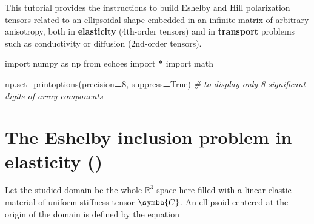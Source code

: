\documentclass[
  a4paper,
  numbers=noendperiod,
  DIV=12]{scrreprt}
\newenvironment{Shaded}{\begin{snugshade}}{\end{snugshade}}
\newcommand{\CommentTok}[1]{\textcolor[rgb]{0.56,0.35,0.01}{\textit{#1}}}
\newcommand{\DecValTok}[1]{\textcolor[rgb]{0.00,0.00,0.81}{#1}}
\newcommand{\ImportTok}[1]{#1}
\newcommand{\NormalTok}[1]{#1}
\newcommand{\OperatorTok}[1]{\textcolor[rgb]{0.81,0.36,0.00}{\textbf{#1}}}
\newcommand{\VariableTok}[1]{\textcolor[rgb]{0.00,0.00,0.00}{#1}}
\newcommand{\R}{{\mathbb{{R}}}}
\newcommand{\uuuu}[1]{{\symbb{{#1}}}}
\begin{document}
\begin{tcolorbox}[enhanced jigsaw, arc=.35mm, bottomrule=.15mm, bottomtitle=1mm, breakable, colback=white, colbacktitle=quarto-callout-important-color!10!white, colframe=quarto-callout-important-color-frame, coltitle=black, left=2mm, leftrule=.75mm, opacityback=0, opacitybacktitle=0.6, rightrule=.15mm, title={Objectives}, titlerule=0mm, toprule=.15mm, toptitle=1mm]

This tutorial provides the instructions to build Eshelby and Hill
polarization tensors related to an ellipsoidal shape embedded in an
infinite matrix of arbitrary anisotropy, both in \textbf{elasticity}
(4th-order tensors) and in \textbf{transport} problems such as
conductivity or diffusion (2nd-order tensors).

\end{tcolorbox}

\begin{tcolorbox}[enhanced jigsaw, arc=.35mm, bottomrule=.15mm, bottomtitle=1mm, breakable, colback=white, colbacktitle=quarto-callout-tip-color!10!white, colframe=quarto-callout-tip-color-frame, coltitle=black, left=2mm, leftrule=.75mm, opacityback=0, opacitybacktitle=0.6, rightrule=.15mm, title={Imports}, titlerule=0mm, toprule=.15mm, toptitle=1mm]

\begin{Shaded}
\begin{Highlighting}[]
\ImportTok{import}\NormalTok{ numpy }\ImportTok{as}\NormalTok{ np}
\ImportTok{from}\NormalTok{ echoes }\ImportTok{import} \OperatorTok{*}
\ImportTok{import}\NormalTok{ math}

\NormalTok{np.set\_printoptions(precision}\OperatorTok{=}\DecValTok{8}\NormalTok{, suppress}\OperatorTok{=}\VariableTok{True}\NormalTok{)}
\CommentTok{\# to display only 8 significant digits of array components}
\end{Highlighting}
\end{Shaded}

\end{tcolorbox}

\section{\texorpdfstring{The Eshelby inclusion problem in elasticity
()}{The Eshelby inclusion problem in elasticity (Eshelby, 1957)}}\label{the-eshelby-inclusion-problem-in-elasticity-eshelby1957}

Let the studied domain be the whole \(\R^3\) space here filled with a
linear elastic material of uniform stiffness tensor \(\uuuu{C}\). An
ellipsoid centered at the origin of the domain is defined by the
equation
\end{document}
